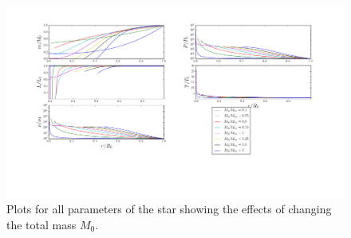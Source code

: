 \documentclass[11pt,twocolumn]{article}
\begin{document}
\begin{figure}[ht]
  \centering
  \includegraphics[width=\linewidth]{fig/M_variation.png}
  \caption{\label{fig:M-variation} Plots for all parameters of the star
  showing the effects of changing the total mass $M_0$.}
\end{figure}






\onecolumn
\printbibliography
\end{document}
